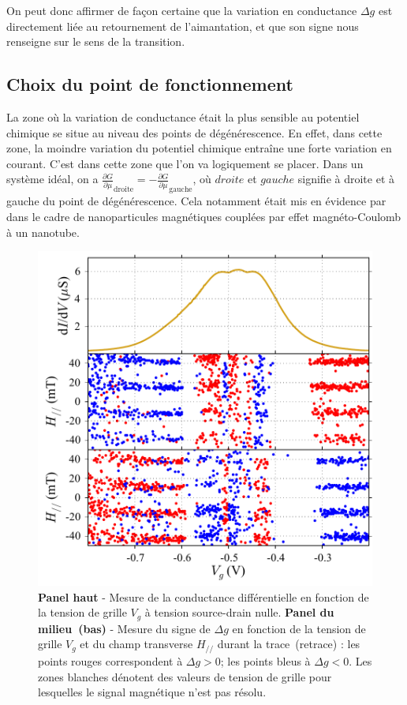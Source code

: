 On peut donc affirmer de façon certaine que la variation en conductance $\Delta g$ est directement liée au retournement de l'aimantation, et que son signe nous renseigne sur le sens de la transition.


\subsection{Choix du point de fonctionnement}
La zone où la variation de conductance était la plus sensible au potentiel chimique se situe au niveau des points de dégénérescence. En effet, dans cette zone, la moindre variation du potentiel chimique entraîne une forte variation en courant. C'est dans cette zone que l'on va logiquement se placer. Dans un système idéal, on a $\frac{\partial G}{\partial \mu}_{\text{droite}} = -\frac{\partial G}{\partial \mu}_{\text{gauche}}$, où $droite$ et $gauche$ signifie à droite et à gauche du point de dégénérescence. Cela notamment était mis en évidence par~\cite{Datta2011} dans le cadre de nanoparticules magnétiques couplées par effet magnéto-Coulomb à un nanotube.

\begin{figure}
\parbox{7cm}{
\includegraphics[scale=0.45]{Resultats/PointFonct/PointFonct.pdf} 
}
\parbox{6.5cm}{\caption{\textbf{Panel haut} - Mesure de la conductance différentielle en fonction de la tension de grille $V_g$ à tension source-drain nulle. \textbf{Panel du milieu~(bas)} - Mesure du signe de $\Delta g$ en fonction de la tension de grille $V_g$ et du champ transverse $H_{//}$ durant la trace~(retrace) : les points rouges correspondent à $\Delta g >0$; les points bleus à $\Delta g <0$. Les zones blanches dénotent des valeurs de tension de grille pour lesquelles le signal magnétique n'est pas résolu.}
\label{point_fonctio}
}
\end{figure}

